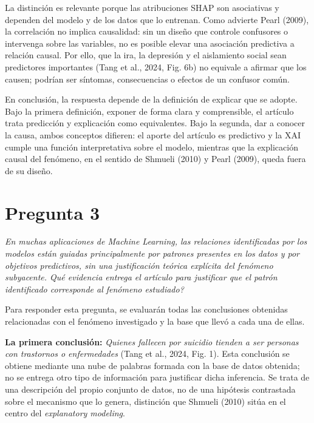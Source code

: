 \documentclass[11pt]{article}
\begin{document}
La distinción es relevante porque las atribuciones SHAP son asociativas y dependen del modelo y de los datos que lo entrenan. Como advierte Pearl (2009), la correlación no implica causalidad: sin un diseño que controle confusores o intervenga sobre las variables, no es posible elevar una asociación predictiva a relación causal. Por ello, que la ira, la depresión y el aislamiento social sean predictores importantes (Tang et al., 2024, Fig. 6b) no equivale a afirmar que los causen; podrían ser síntomas, consecuencias o efectos de un confusor común.

En conclusión, la respuesta depende de la definición de explicar que se adopte. Bajo la primera definición, exponer de forma clara y comprensible, el artículo trata predicción y explicación como equivalentes. Bajo la segunda, dar a conocer la causa, ambos conceptos difieren: el aporte del artículo es predictivo y la XAI cumple una función interpretativa sobre el modelo, mientras que la explicación causal del fenómeno, en el sentido de Shmueli (2010) y Pearl (2009), queda fuera de su diseño.

\clearpage


\section*{Pregunta 3}

\textit{En muchas aplicaciones de Machine Learning, las relaciones identificadas
por los modelos est\'an guiadas principalmente por patrones presentes en los
datos y por objetivos predictivos, sin una justificaci\'on te\'orica expl\'icita
del fen\'omeno subyacente. \textquestiondown Qu\'e evidencia entrega el art\'iculo
para justificar que el patr\'on identificado corresponde al fen\'omeno estudiado?}

\vspace{0.5em}

Para responder esta pregunta, se evaluar\'an todas las conclusiones obtenidas
relacionadas con el fen\'omeno investigado y la base que llev\'o a cada una de ellas.

\textbf{La primera conclusi\'on:} \emph{Quienes fallecen por suicidio tienden a
ser personas con trastornos o enfermedades} (Tang et al., 2024, Fig. 1). Esta
conclusi\'on se obtiene mediante una nube de palabras formada con la base de datos
obtenida; no se entrega otro tipo de informaci\'on para justificar dicha inferencia.
Se trata de una descripci\'on del propio conjunto de datos, no de una hip\'otesis
contrastada sobre el mecanismo que lo genera, distinci\'on que Shmueli (2010) sit\'ua
en el centro del \emph{explanatory modeling}.
\end{document}

